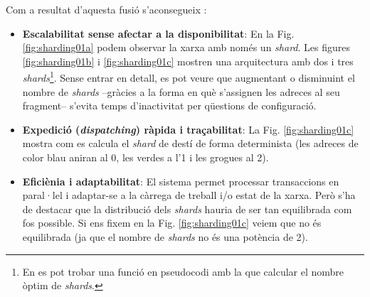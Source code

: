 \documentclass[11pt,a4paper]{article}
\begin{document}
Com a resultat d'aquesta fusió s'aconsegueix \cite{elrond2022}:
\begin{itemize}
	\item \textbf{Escalabilitat sense afectar a la disponibilitat}: En la Fig. \ref{fig:sharding01a} podem observar la xarxa amb només un \textit{shard}. Les figures \ref{fig:sharding01b} i \ref{fig:sharding01c} mostren una arquitectura amb dos i tres \textit{shards}\footnote{En \cite{elrond2019} es pot trobar una funció en pseudocodi amb la que calcular el nombre òptim de \textit{shards}.}. Sense entrar en detall, es pot veure que augmentant o disminuint el nombre de \textit{shards} –gràcies a la forma en què s'assignen les adreces al seu fragment– s'evita temps d'inactivitat per qüestions de configuració.
	\item \textbf{Expedició (\textit{dispatching}) ràpida i traçabilitat}: La Fig. \ref{fig:sharding01c} mostra com es calcula el \textit{shard} de destí de forma determinista (les adreces de color blau aniran al 0, les verdes a l'1 i les grogues al 2).
	\item \textbf{Eficiènia i adaptabilitat}: El sistema permet processar transaccions en paral·lel i adaptar-se a la càrrega de treball i/o estat de la xarxa. Però s'ha de destacar que la distribució dels \textit{shards} hauria de ser tan equilibrada com fos possible. Si ens fixem en la Fig. \ref{fig:sharding01c} veiem que no és equilibrada (ja que el nombre de \textit{shards} no és una potència de 2).
\end{itemize}
\end{document}

